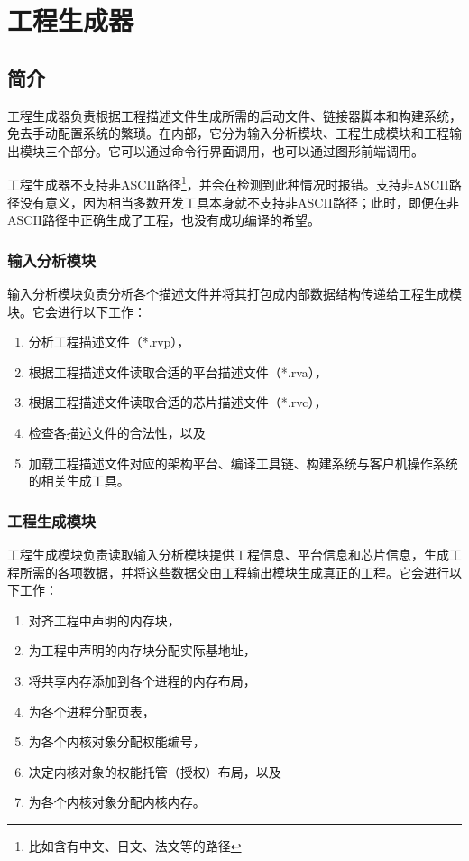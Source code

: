 \chapter{工程生成器}\label{ch:5-generator}


\section{简介}\label{sec:5-1}

工程生成器负责根据工程描述文件生成所需的启动文件、链接器脚本和构建系统，免去手动配置系统的繁琐。在内部，它分为输入分析模块、工程生成模块和工程输出模块三个部分。它可以通过命令行界面调用，也可以通过图形前端调用。

工程生成器不支持非ASCII路径\footnote{比如含有中文、日文、法文等的路径}，并会在检测到此种情况时报错。支持非ASCII路径没有意义，因为相当多数开发工具本身就不支持非ASCII路径；此时，即便在非ASCII路径中正确生成了工程，也没有成功编译的希望。

\subsection{输入分析模块}\label{subsec:5-1-1}

输入分析模块负责分析各个描述文件并将其打包成内部数据结构传递给工程生成模块。它会进行以下工作：

\begin{enumerate}
\def\labelenumi{\arabic{enumi}.}
\item
  分析工程描述文件（*.rvp），
\item
  根据工程描述文件读取合适的平台描述文件（*.rva），
\item
  根据工程描述文件读取合适的芯片描述文件（*.rvc），
\item
  检查各描述文件的合法性，以及
\item
  加载工程描述文件对应的架构平台、编译工具链、构建系统与客户机操作系统的相关生成工具。
\end{enumerate}

\subsection{工程生成模块}\label{subsec:5-1-2}

工程生成模块负责读取输入分析模块提供工程信息、平台信息和芯片信息，生成工程所需的各项数据，并将这些数据交由工程输出模块生成真正的工程。它会进行以下工作：

\begin{enumerate}
\def\labelenumi{\arabic{enumi}.}
\item
  对齐工程中声明的内存块，
\item
  为工程中声明的内存块分配实际基地址，
\item
  将共享内存添加到各个进程的内存布局，
\item
  为各个进程分配页表，
\item
  为各个内核对象分配权能编号，
\item
  决定内核对象的权能托管（授权）布局，以及
\item
  为各个内核对象分配内核内存。
\end{enumerate}

